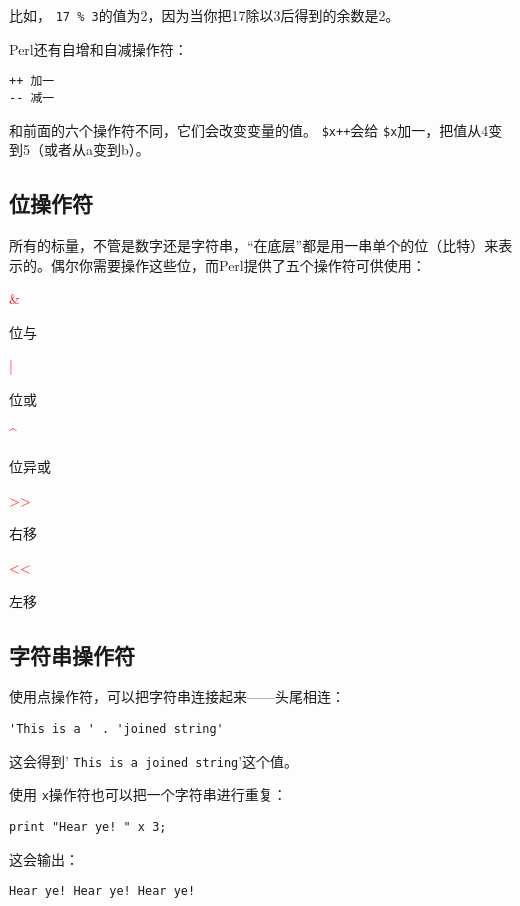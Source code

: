 比如， \verb|17 % 3|的值为2，因为当你把17除以3后得到的余数是2。

Perl还有自增和自减操作符：

\begin{lstlisting}
++ 加一
-- 减一
\end{lstlisting}

和前面的六个操作符不同，它们会改变变量的值。 \verb|$x++|会给 \verb|$x|加一，把值从4变到5（或者从a变到b）。

\subsection{位操作符}
所有的标量，不管是数字还是字符串，“在底层”都是用一串单个的位（比特）来表示的。偶尔你需要操作这些位，而Perl提供了五个操作符可供使用：

\noindent
\textcolor{red}{\&}
\begin{adjustwidth}{4em}{}
位与
\end{adjustwidth}
\textcolor{red}{|}
\begin{adjustwidth}{4em}{}
位或
\end{adjustwidth}
\textcolor{red}{\^{}}
\begin{adjustwidth}{4em}{}
位异或
\end{adjustwidth}
\textcolor{red}{\textgreater\textgreater}
\begin{adjustwidth}{4em}{}
右移
\end{adjustwidth}
\textcolor{red}{\textless\textless}
\begin{adjustwidth}{4em}{}
左移
\end{adjustwidth}

\subsection{字符串操作符}
使用点操作符，可以把字符串连接起来——头尾相连：

\begin{lstlisting}
'This is a ' . 'joined string'
\end{lstlisting}

这会得到' \verb|This is a joined string|'这个值。

使用 \verb|x|操作符也可以把一个字符串进行重复：

\begin{lstlisting}
print "Hear ye! " x 3;
\end{lstlisting}

这会输出：

\begin{lstlisting}
Hear ye! Hear ye! Hear ye!
\end{lstlisting}

